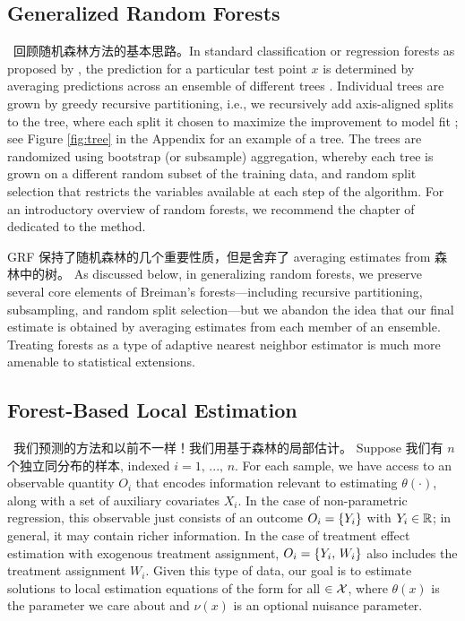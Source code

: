 \documentclass[aos]{imsart}
\theoremstyle{plain}
\theoremstyle{definition}
\theoremstyle{remark}
\begin{document}
\begin{CJK}{UTF8}{gbsn}
\newpage



\section{Generalized Random Forests} \,  回顾随机森林方法的基本思路。In standard classification or regression forests as proposed by \citet{breiman2001random}, the prediction for a
particular test point $x$ is determined by averaging predictions across an ensemble of different trees
\citep{amit1997shape,breiman1996bagging,dietterich2000experimental,ho1998random}.
Individual trees are grown by greedy recursive partitioning, i.e.,
we recursively add axis-aligned splits to the tree, where each split it chosen to maximize the
improvement to model fit \citep{breiman1984classification};
see Figure \ref{fig:tree} in the Appendix for an example of a tree. The trees are randomized using
bootstrap (or subsample) aggregation, whereby each tree is grown on a different random subset of the training data, and random split selection that restricts the variables available at each step of the algorithm. For an introductory overview of random forests, we recommend the chapter of \citet{hastie2009elements} dedicated to the method.  

GRF 保持了随机森林的几个重要性质，但是舍弃了 averaging estimates from 森林中的树。 As discussed below, in generalizing
random forests, we preserve several core elements of Breiman's forests---including recursive partitioning,
subsampling, and random split selection---but we abandon the idea that our final estimate
is obtained by averaging estimates from each member of an ensemble.
Treating forests as a type of
adaptive nearest neighbor estimator is much more amenable
to statistical extensions.

\subsection{Forest-Based Local Estimation}
\label{sec:ANN}
\, 我们预测的方法和以前不一样！我们用基于森林的局部估计。 Suppose 我们有 $n$ 个独立同分布的样本, indexed
$ i = 1, \, ..., \, n$. For each sample, we have
access to an observable quantity $O_i$ that encodes information
relevant to estimating $\theta(\cdot)$, along with a set of auxiliary covariates $X_i$. In the case of non-parametric
regression, this observable just consists of an outcome $O_i = \left\{Y_i\right\}$ with $Y_i \in \mathbb{R}$; in
general, it may contain richer information. In the case of treatment effect
estimation with exogenous treatment assignment, $O_i = \left\{Y_i, \, W_i\right\}$ also includes the treatment
assignment $W_i$.
Given this type of data, our goal is to estimate solutions to local estimation equations
of the form
 for all $\in \mathcal{X}$, 
where $\theta(x)$ is the parameter we care about and $\nu(x)$ is an optional
nuisance parameter.


\end{CJK}
\end{document}
